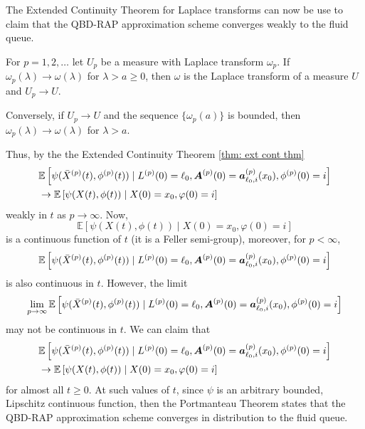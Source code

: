 The Extended Continuity Theorem for Laplace transforms \cite[Chapter XIII, Theorem 2a]{feller1957} can now be use to claim that the QBD-RAP approximation scheme converges weakly to the fluid queue.
\begin{thm}\label{thm: ext cont thm}
	For \(p=1,2,\dots\) let \(U_p\) be a measure with Laplace transform \(\omega_p\). If \(\omega_p(\lambda)\to\omega(\lambda)\) for \(\lambda > a\geq 0\), then \(\omega\) is the Laplace transform of a measure \(U\) and \(U_p\to U\).
	
	Conversely, if \(U_p\to U\) and the sequence \(\{\omega_p(a)\}\) is bounded, then \(\omega_p(\lambda)\to\omega(\lambda)\) for \(\lambda >a\). 
\end{thm}
Thus, by the the Extended Continuity Theorem \ref{thm: ext cont thm}
\begin{align}
		&\mathbb E\left[\psi(\bar X^{(p)}(t),\phi^{(p)}(t))  \mid L^{(p)}(0)=\ell_0, \boldsymbol A^{(p)}(0)=\boldsymbol  a_{\ell_0,i}^{(p)}(x_0), \phi^{(p)}(0)=i \right] \nonumber
		\\&\to \mathbb E\left[\psi(X(t),\phi(t))\mid X(0)=x_0, \varphi(0)=i \right] \nonumber
\end{align}
weakly in \(t\) as \(p\to \infty\). Now, \[\mathbb E\left[\psi(X(t),\phi(t))\mid X(0)=x_0, \varphi(0)=i \right]\] is a continuous function of \(t\) (it is a Feller semi-group), moreover, for \(p<\infty\), \[\mathbb E\left[\psi(\bar X^{(p)}(t),\phi^{(p)}(t))  \mid L^{(p)}(0)=\ell_0, \boldsymbol A^{(p)}(0)=\boldsymbol  a_{\ell_0,i}^{(p)}(x_0), \phi^{(p)}(0)=i \right] \] is also continuous in \(t\). However, the limit \[\lim\limits_{p\to\infty}\mathbb E\left[\psi(\bar X^{(p)}(t),\phi^{(p)}(t))  \mid L^{(p)}(0)=\ell_0, \boldsymbol A^{(p)}(0)=\boldsymbol  a_{\ell_0,i}^{(p)}(x_0), \phi^{(p)}(0)=i \right] \] may not be continuous in \(t\). We can claim that 
\begin{align}
		&\mathbb E\left[\psi(\bar X^{(p)}(t),\phi^{(p)}(t))  \mid L^{(p)}(0)=\ell_0, \boldsymbol A^{(p)}(0)=\boldsymbol  a_{\ell_0,i}^{(p)}(x_0), \phi^{(p)}(0)=i \right] \nonumber
		\\&\to \mathbb E\left[\psi(X(t),\phi(t))\mid X(0)=x_0, \varphi(0)=i \right] \nonumber
\end{align}
for almost all \(t\geq 0\). At such values of \(t\), since \(\psi\) is an arbitrary bounded, Lipschitz continuous function, then the Portmanteau Theorem states that the QBD-RAP approximation scheme converges in distribution to the fluid queue.

